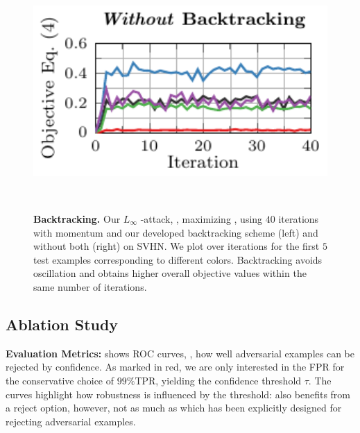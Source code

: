 \begin{figure}[t]
\begin{minipage}[t]{0.235\textwidth}
        \includegraphics[width=1\textwidth]{fig_msvhn_attack_error_advtrain_2}
    \end{minipage}
    \\
    \vspace*{-14px}
    \caption{\textbf{Backtracking.} Our $L_\infty$ \PGD-\FConf attack, \ie, \PGD maximizing , using $40$ iterations with momentum and our developed backtracking scheme (left) and without both (right) on SVHN. We plot  over iterations for the first $5$ test examples corresponding to different colors. Backtracking avoids oscillation and obtains higher overall objective values within the same number of iterations.}
    \label{fig:experiments-momback}
    \vspace*{-4px}
\end{figure}

\subsection{Ablation Study}
\label{subsec:experiments-ablation}

\textbf{Evaluation Metrics:}
%
 shows ROC curves, \ie, how well adversarial examples can be rejected by confidence. As marked in \textcolor{colorbrewer1}{red}, we are only interested in the FPR for the conservative choice of $99\%$TPR, yielding the confidence threshold $\tau$. The \RTE curves highlight how robustness is influenced by the threshold: \AdvTrain also benefits from a reject option, however, not as much as \ConfTrain which has been explicitly designed for rejecting adversarial examples.

